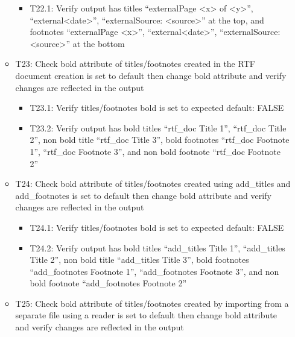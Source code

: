 \documentclass[]{article}
\providecommand{\tightlist}{%
  \setlength{\itemsep}{0pt}\setlength{\parskip}{0pt}}
\begin{document}
\begin{itemize}
\begin{itemize}
    \begin{itemize}
    \tightlist
    \item
      T22.1: Verify output has titles ``externalPage
      \textless{}x\textgreater{} of \textless{}y\textgreater{}'',
      ``external\textless{}date\textgreater{}'', ``externalSource:
      \textless{}source\textgreater{}'' at the top, and footnotes
      ``externalPage \textless{}x\textgreater{}'',
      ``external\textless{}date\textgreater{}'', ``externalSource:
      \textless{}source\textgreater{}'' at the bottom
    \end{itemize}
  \item
    T23: Check bold attribute of titles/footnotes created in the RTF
    document creation is set to default then change bold attribute and
    verify changes are reflected in the output

    \begin{itemize}
    \tightlist
    \item
      T23.1: Verify titles/footnotes bold is set to expected default:
      FALSE
    \item
      T23.2: Verify output has bold titles ``rtf\_doc Title 1'',
      ``rtf\_doc Title 2'', non bold title ``rtf\_doc Title 3'', bold
      footnotes ``rtf\_doc Footnote 1'', ``rtf\_doc Footnote 3'', and
      non bold footnote ``rtf\_doc Footnote 2''
    \end{itemize}
  \item
    T24: Check bold attribute of titles/footnotes created using
    add\_titles and add\_footnotes is set to default then change bold
    attribute and verify changes are reflected in the output

    \begin{itemize}
    \tightlist
    \item
      T24.1: Verify titles/footnotes bold is set to expected default:
      FALSE
    \item
      T24.2: Verify output has bold titles ``add\_titles Title 1'',
      ``add\_titles Title 2'', non bold title ``add\_titles Title 3'',
      bold footnotes ``add\_footnotes Footnote 1'', ``add\_footnotes
      Footnote 3'', and non bold footnote ``add\_footnotes Footnote 2''
    \end{itemize}
  \item
    T25: Check bold attribute of titles/footnotes created by importing
    from a separate file using a reader is set to default then change
    bold attribute and verify changes are reflected in the output


\end{itemize}
\end{itemize}
\end{document}
